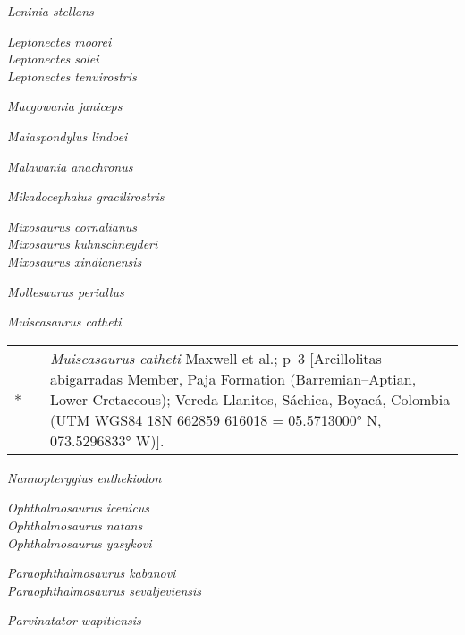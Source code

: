 \documentclass[british,11pt]{article}
\newenvironment*{synonymy}%
	{
		\footnotesize
		\begin{tabu}[l]{rlX}
	}%
	{
		\\
		\end{tabu}
		\normalsize
	}
\begin{document}
\emph{Leninia stellans} \cite*[Fischer et al.,][]{Fischer2014}

\emph{Leptonectes moorei} \cite*[McGowan \& Milner,][]{McGowan1999a}\\
\emph{Leptonectes solei} \parencite*[McGowan,][]{McGowan1993}\\
\emph{Leptonectes tenuirostris} \parencite*[Conybeare,][]{Conybeare1822}

\emph{Macgowania janiceps} \parencite*[McGowan,][]{McGowan1996}

\emph{Maiaspondylus lindoei} \cite*[Maxwell \& Caldwell,][]{Maxwell2006a}

\emph{Malawania anachronus} \cite*[Fischer et al.,][]{Fischer2013a}

\emph{Mikadocephalus gracilirostris} \cite*[Maisch \& Matzke,][]{Maisch1997c}

\emph{Mixosaurus cornalianus} \parencite*[Bassani,][]{Bassani1886}\\
\emph{Mixosaurus kuhnschneyderi} \parencite*[Brinkmann,][]{Brinkmann1998a}\\
\emph{Mixosaurus xindianensis} \cite*[Chen \& Cheng,][]{Chen2010}

\emph{Mollesaurus periallus} \cite*[Fernández,][]{Fernandez1999}

\emph{Muiscasaurus catheti} \cite*[Maxwell et al.,][]{Maxwell2016}\\
\begin{synonymy}
	*	& \cite*{Maxwell2016}	& \emph{Muiscasaurus catheti} Maxwell et al.; p~3 [Arcillolitas abigarradas Member, Paja Formation (Barremian–Aptian, Lower Cretaceous); Vereda Llanitos, Sáchica, Boyacá, Colombia (UTM WGS84 18N 662859 616018 = 05.5713000° N, 073.5296833° W)].
\end{synonymy}

\emph{Nannopterygius enthekiodon} \parencite*[Hulke,][]{Hulke1871}

\emph{Ophthalmosaurus icenicus} \cite*[Seeley,][]{Seeley1874}\\
\emph{Ophthalmosaurus natans} \parencite*[Marsh,][]{Marsh1879}\\
\emph{Ophthalmosaurus yasykovi} \parencite*[Efimov,][]{Efimov1999}

\emph{Paraophthalmosaurus kabanovi} \parencite*[Efimov,][]{Efimov1999}\\
\emph{Paraophthalmosaurus sevaljeviensis} \cite*[Arkhangelsky,][]{Arkhangelsky1997}

\emph{Parvinatator wapitiensis} \cite*[Nicholls \& Brinkman,][]{Nicholls1995}
\end{document}

